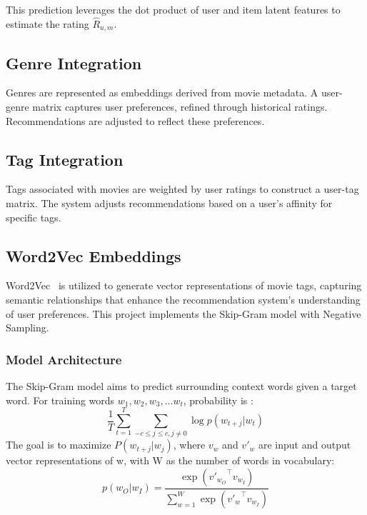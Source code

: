 \documentclass[nonacm, sigconf]{acmart}
\begin{document}
This prediction leverages the dot product of user and item latent features to estimate the rating $\hat{R}_{u,m}$.

\subsection{Genre Integration}
Genres are represented as embeddings derived from movie metadata. A user-genre matrix captures user preferences, refined through historical ratings. Recommendations are adjusted to reflect these preferences.

\subsection{Tag Integration}
Tags associated with movies are weighted by user ratings to construct a user-tag matrix. The system adjusts recommendations based on a user's affinity for specific tags.

\subsection{Word2Vec Embeddings}
\label{sec:word2vec}

Word2Vec~\cite{mikolov2013distributed} is utilized to generate vector representations of movie tags, capturing semantic relationships that enhance the recommendation system's understanding of user preferences. This project implements the Skip-Gram\cite{gensim_word2vec_github, word2vec_gfg, tensorflow_word2vec_github} model with Negative Sampling\cite{mccormickml_word2vec}.

\subsubsection{Model Architecture}
The Skip-Gram model aims to predict surrounding context words given a target word. For training words $w_1, w_2, w_3, ... w_t$, probability is \cite{mikolov2013distributed, tensorflow_word2vec_docs}:
\begin{equation}
\frac1T\sum_{t=1}^T\sum_{-c\leq j\leq c, j\neq 0} \log p(w_{t+j}|w_t)
\end{equation}
The goal is to maximize $P(w_{t+j}|w_j)$,  where $v_w$ and $v'_w$ are input and output vector representations of w, with W as the number of words in vocabulary\cite{mikolov2013distributed, tensorflow_word2vec_docs}: 
\begin{equation}
p(w_O|w_I) = \frac{\exp\left({v'_{w_O}}^\top v_{w_I}\right)}
{\sum_{w=1}^{W}\exp\left({v'_w}^\top v_{w_I}\right)}
\end{equation}
\end{document}
